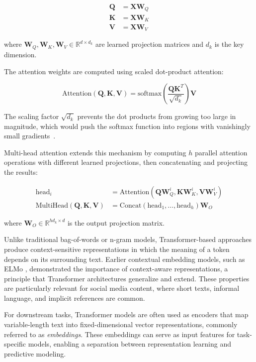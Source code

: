 \begin{align}
\mathbf{Q} &= \mathbf{X}\mathbf{W}_Q \\
\mathbf{K} &= \mathbf{X}\mathbf{W}_K \\
\mathbf{V} &= \mathbf{X}\mathbf{W}_V
\end{align}

where $\mathbf{W}_Q, \mathbf{W}_K, \mathbf{W}_V \in \mathbb{R}^{d \times d_k}$ are learned projection matrices and $d_k$ is the key dimension.

The attention weights are computed using scaled dot-product attention:

\begin{equation}
\text{Attention}(\mathbf{Q}, \mathbf{K}, \mathbf{V}) = \text{softmax}\left(\frac{\mathbf{Q}\mathbf{K}^T}{\sqrt{d_k}}\right)\mathbf{V}
\end{equation}

The scaling factor $\sqrt{d_k}$ prevents the dot products from growing too large in magnitude, which would push the softmax function into regions with vanishingly small gradients~\cite{Vaswani2017}.

Multi-head attention extends this mechanism by computing $h$ parallel attention operations with different learned projections, then concatenating and projecting the results:

\begin{align}
\text{head}_i &= \text{Attention}(\mathbf{Q}\mathbf{W}_Q^i, \mathbf{K}\mathbf{W}_K^i, \mathbf{V}\mathbf{W}_V^i) \\
\text{MultiHead}(\mathbf{Q}, \mathbf{K}, \mathbf{V}) &= \text{Concat}(\text{head}_1, \ldots, \text{head}_h)\mathbf{W}_O
\end{align}

where $\mathbf{W}_O \in \mathbb{R}^{hd_k \times d}$ is the output projection matrix.


Unlike traditional bag-of-words or n-gram models, Transformer-based approaches produce context-sensitive representations in which the meaning of a token depends on its surrounding text. Earlier contextual embedding models, such as ELMo \cite{Peters2018}, demonstrated the importance of context-aware representations, a principle that Transformer architectures generalize and extend. These properties are particularly relevant for social media content, where short texts, informal language, and implicit references are common.

For downstream tasks, Transformer models are often used as encoders that map variable-length text into fixed-dimensional vector representations, commonly referred to as \emph{embeddings}. These embeddings can serve as input features for task-specific models, enabling a separation between representation learning and predictive modeling.


